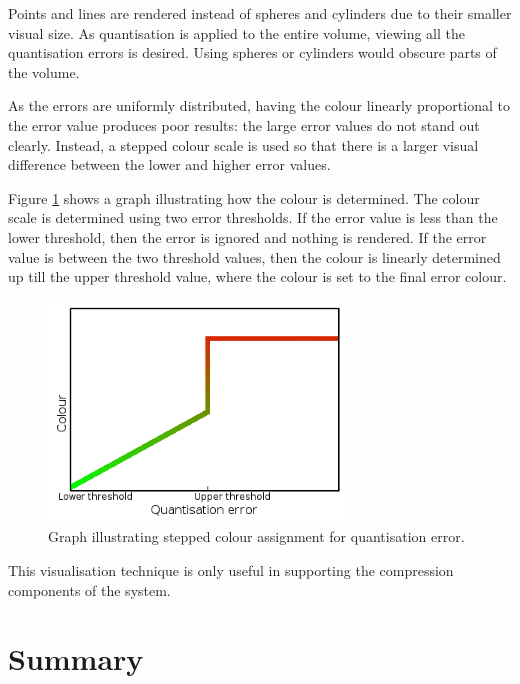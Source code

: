 Points and lines are rendered instead of spheres and cylinders due to their
smaller visual size. As quantisation is applied to the entire volume, viewing
all the quantisation errors is desired. Using spheres or cylinders would
obscure parts of the volume.

As the errors are uniformly distributed, having the colour linearly
proportional to the error value produces poor results: the large error values
do not stand out clearly. Instead, a stepped colour scale is used so that there
is a larger visual difference between the lower and higher error values.

Figure \ref{fig:design_quantgraph} shows a graph illustrating how the colour is
determined. The colour scale is determined using two error thresholds. If the
error value is less than the lower threshold, then the error is ignored and
nothing is rendered. If the error value is between the two threshold values,
then the colour is linearly determined up till the upper threshold value, where
the colour is set to the final error colour.

\begin{figure}
  \begin{center}
    \includegraphics[width=80mm]{quant_colour_graph}
  \end{center}
  \caption{Graph illustrating stepped colour assignment for quantisation error.}
  \label{fig:design_quantgraph}
\end{figure}

This visualisation technique is only useful in supporting the compression
components of the system.



\newpage

\section{Summary}
\label{sec:design_summary}

